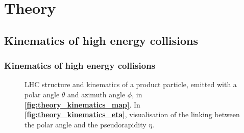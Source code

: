 \documentclass[xcolor=table,8pt]{beamer}
\begin{document}
    \section{Theory}
    
    \subsection{Kinematics of high energy collisions}
    \begin{frame}[t]
        \frametitle{Kinematics of high energy collisions}
        
        \begin{figure}[!h]
            \begin{minipage}[c]{0.50\linewidth}
                \vspace{0pt}
                \centering
            \end{minipage}%
            \begin{minipage}[c]{0.50\linewidth}
                \vspace{0pt}
                \centering
            \end{minipage}%
            \caption{LHC structure and kinematics of a product particle, emitted with a polar angle \( \theta \) and azimuth angle \( \phi \), in \textbf{\ref{fig:theory_kinematics_map}}. In \textbf{\ref{fig:theory_kinematics_eta}}, visualisation of the linking between the polar angle and the pseudorapidity \( \eta \).}
            \label{fig:theory_kinematics_map_eta}
        \end{figure}


\end{frame}
\end{document}
